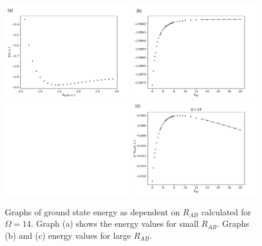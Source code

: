 \documentclass{pracalicmgr}
\begin{document}
\begin{figure}[H]
    \center
    \includegraphics[width=0.49\textwidth]{14E_beginning.pdf}
    \includegraphics[width=0.49\textwidth]{14E_ending.pdf}
    \includegraphics[width=0.49\textwidth]{empty.pdf}
    \includegraphics[width=0.49\textwidth]{14_ending_dos.pdf}
    \caption{Graphs of ground state energy as dependent on $R_{AB}$ calculated for $\Omega = 14$. Graph (a) shows the energy values for small $R_{AB}$. Graphs (b) and (c) energy values for large $R_{AB}$.}
    \label{E partial}
\end{figure}
\end{document}
